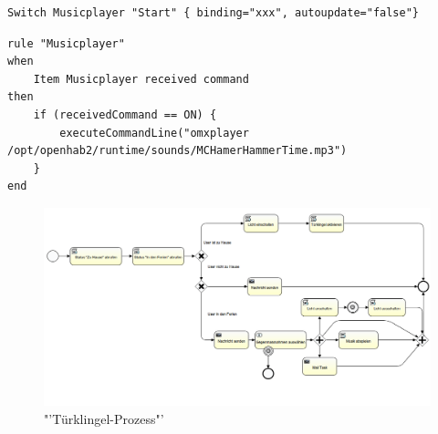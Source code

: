\begin{lstlisting}[caption={Item-Definition für den "`Virtuellen Musikplayer"'},label={lst:analyse:item:musicplayer}]
Switch Musicplayer "Start" { binding="xxx", autoupdate="false"}
\end{lstlisting}


\begin{lstlisting}[caption={Item-Regel für den "`Virtuellen Musikplayer"'},label={lst:analyse:rule:musicplayer}]
rule "Musicplayer"
when
	Item Musicplayer received command
then
	if (receivedCommand == ON) {
		executeCommandLine("omxplayer /opt/openhab2/runtime/sounds/MCHamerHammerTime.mp3")
	}
end
\end{lstlisting}

\newpage
\begin{landscape}
\begin{figure}
  \centering
  \includegraphics[width=21cm]{./images/DoorBellProcess}
  \caption{"'Türklingel-Prozess"'}\label{img:AnalyseRpi:DoorbellProcess}
\end{figure}
\end{landscape}
